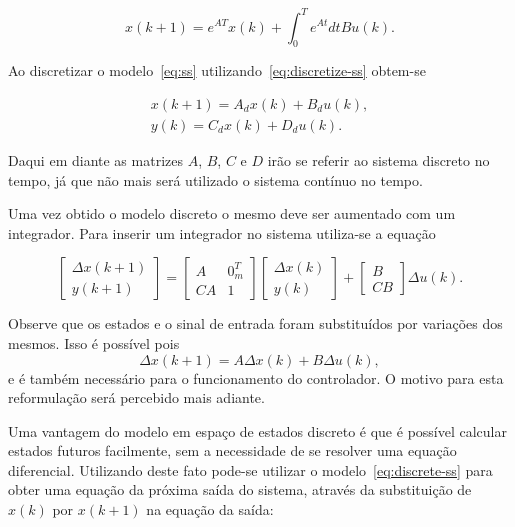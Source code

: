 \begin{equation}
	\label{eq:discretize-ss}
	x(k+1) = e^{AT} x(k) + \int^T_0{e^{At}dt}B u(k).
\end{equation}

Ao discretizar o modelo~\eqref{eq:ss} utilizando~\eqref{eq:discretize-ss}
obtem-se

\begin{equation}
	\label{eq:discrete-ss}
	\begin{split}
		x(k+1) = A_d x(k) + B_d u(k), \\
		y(k) = C_d x(k) + D_d u(k).
	\end{split}
\end{equation}

Daqui em diante as matrizes \(A\), \(B\), \(C\) e \(D\) irão se referir ao
sistema discreto no tempo, já que não mais será utilizado o sistema contínuo no
tempo.

Uma vez obtido o modelo discreto o mesmo deve ser aumentado com um integrador.
Para inserir um integrador no sistema utiliza-se a equação

\begin{equation}
	\label{eq:augment-matrix}
	\begin{bmatrix}
		\Delta x(k+1) \\
		y(k+1)
	\end{bmatrix} =
	\begin{bmatrix}
		A  & 0_m^T \\
		CA & 1
	\end{bmatrix}
	\begin{bmatrix}
		\Delta x(k) \\
		y(k)
	\end{bmatrix} +
	\begin{bmatrix}
		B \\
		CB
	\end{bmatrix}
	\Delta u(k).
\end{equation}

Observe que os estados e o sinal de entrada foram substituídos por variações dos
mesmos. Isso é possível pois
%
\begin{equation}
	\Delta x(k+1) = A \Delta x(k) + B \Delta u(k),
\end{equation}
%
e é também necessário para o funcionamento do controlador. O motivo para esta
reformulação será percebido mais adiante.

Uma vantagem do modelo em espaço de estados discreto é que é possível calcular
estados futuros facilmente, sem a necessidade de se resolver uma equação
diferencial. Utilizando deste fato pode-se utilizar o
modelo~\eqref{eq:discrete-ss} para obter uma equação da próxima saída do
sistema, através da substituição de \( x(k) \) por \( x(k+1) \) na equação da
saída:

